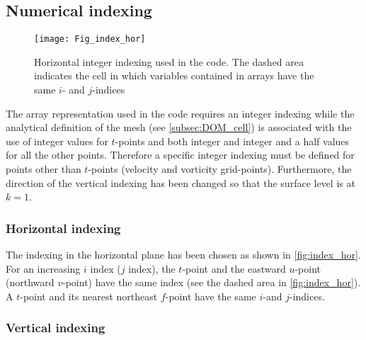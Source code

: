 \documentclass[../main/NEMO_manual]{subfiles}
\begin{document}
\subsection{Numerical indexing}
\label{subsec:DOM_Num_Index}

\begin{figure}[!tb]
  \begin{center}
    \texttt{[image: Fig\_index\_hor]}
    \caption{
      \protect\label{fig:index_hor}
      Horizontal integer indexing used in the \fortran code.
      The dashed area indicates the cell in which variables contained in arrays have the same $i$- and $j$-indices
    }
  \end{center}
\end{figure}

The array representation used in the \fortran code requires an integer indexing while
the analytical definition of the mesh (see \autoref{subsec:DOM_cell}) is associated with the use of
integer values for $t$-points and both integer and integer and a half values for all the other points.
Therefore a specific integer indexing must be defined for points other than $t$-points
(\ie velocity and vorticity grid-points).
Furthermore, the direction of the vertical indexing has been changed so that the surface level is at $k = 1$.

\subsubsection{Horizontal indexing}
\label{subsec:DOM_Num_Index_hor}

The indexing in the horizontal plane has been chosen as shown in \autoref{fig:index_hor}.
For an increasing $i$ index ($j$ index),
the $t$-point and the eastward $u$-point (northward $v$-point) have the same index
(see the dashed area in \autoref{fig:index_hor}).
A $t$-point and its nearest northeast $f$-point have the same $i$-and $j$-indices.

\subsubsection{Vertical indexing}
\label{subsec:DOM_Num_Index_vertical}
\end{document}
